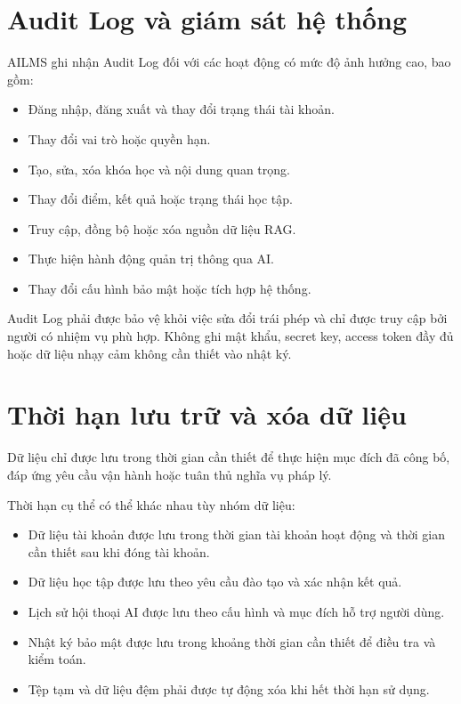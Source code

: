 \documentclass[12pt,a4paper]{article}
\begin{document}
\section{Audit Log và giám sát hệ thống}

AILMS ghi nhận Audit Log đối với các hoạt động có mức độ ảnh hưởng cao, bao gồm:

\begin{itemize}
    \item Đăng nhập, đăng xuất và thay đổi trạng thái tài khoản.
    \item Thay đổi vai trò hoặc quyền hạn.
    \item Tạo, sửa, xóa khóa học và nội dung quan trọng.
    \item Thay đổi điểm, kết quả hoặc trạng thái học tập.
    \item Truy cập, đồng bộ hoặc xóa nguồn dữ liệu RAG.
    \item Thực hiện hành động quản trị thông qua AI.
    \item Thay đổi cấu hình bảo mật hoặc tích hợp hệ thống.
\end{itemize}

Audit Log phải được bảo vệ khỏi việc sửa đổi trái phép và chỉ được truy cập bởi
người có nhiệm vụ phù hợp. Không ghi mật khẩu, secret key, access token đầy đủ
hoặc dữ liệu nhạy cảm không cần thiết vào nhật ký.

\section{Thời hạn lưu trữ và xóa dữ liệu}

Dữ liệu chỉ được lưu trong thời gian cần thiết để thực hiện mục đích đã công bố,
đáp ứng yêu cầu vận hành hoặc tuân thủ nghĩa vụ pháp lý.

Thời hạn cụ thể có thể khác nhau tùy nhóm dữ liệu:

\begin{itemize}
    \item Dữ liệu tài khoản được lưu trong thời gian tài khoản hoạt động và thời gian cần thiết sau khi đóng tài khoản.
    \item Dữ liệu học tập được lưu theo yêu cầu đào tạo và xác nhận kết quả.
    \item Lịch sử hội thoại AI được lưu theo cấu hình và mục đích hỗ trợ người dùng.
    \item Nhật ký bảo mật được lưu trong khoảng thời gian cần thiết để điều tra và kiểm toán.
    \item Tệp tạm và dữ liệu đệm phải được tự động xóa khi hết thời hạn sử dụng.
\end{itemize}
\end{document}
